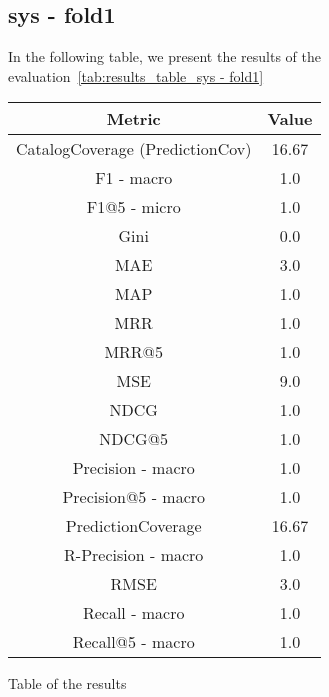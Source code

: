 \documentclass[11pt]{article}
\begin{document}



\subsection{sys - fold1}\label{subsec:sys - fold1}
In the following table, we present the results of the evaluation~\ref{tab:results_table_sys - fold1}

\begin{center}
    \begin{tabular}{|c|c|}
        \hline
        \textbf{Metric} & \textbf{Value} \\ \hline
                CatalogCoverage (PredictionCov) & 16.67 \\ \hline
                F1 - macro & 1.0 \\ \hline
                F1@5 - micro & 1.0 \\ \hline
                Gini & 0.0 \\ \hline
                MAE & 3.0 \\ \hline
                MAP & 1.0 \\ \hline
                MRR & 1.0 \\ \hline
                MRR@5 & 1.0 \\ \hline
                MSE & 9.0 \\ \hline
                NDCG & 1.0 \\ \hline
                NDCG@5 & 1.0 \\ \hline
                Precision - macro & 1.0 \\ \hline
                Precision@5 - macro & 1.0 \\ \hline
                PredictionCoverage & 16.67 \\ \hline
                R-Precision - macro & 1.0 \\ \hline
                RMSE & 3.0 \\ \hline
                Recall - macro & 1.0 \\ \hline
                Recall@5 - macro & 1.0 \\ \hline
             \end{tabular}
    \captionsetup{type=table}
    \caption{Table of the results}
    \label{tab:results_table_sys - fold1}
\end{center}
\hfill\break
\hfill\break
\end{document}
